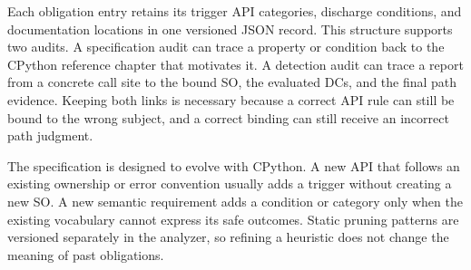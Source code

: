 Each obligation entry retains its trigger API categories, discharge
conditions, and documentation locations in one versioned JSON record. This
structure supports two audits. A specification audit can trace a
property or condition back to the CPython reference chapter that motivates it.
A detection audit can trace a report from a concrete call site to the bound SO,
the evaluated DCs, and the final path evidence. Keeping both links is necessary
because a correct API rule can still be bound to the wrong subject, and a
correct binding can still receive an incorrect path judgment.

The specification is designed to evolve with CPython. A new API that follows
an existing ownership or error convention usually adds a trigger without
creating a new SO. A new semantic requirement adds a condition or category
only when the existing vocabulary cannot express its safe outcomes. Static
pruning patterns are versioned separately in the analyzer, so refining a
heuristic does not change the meaning of past obligations.
